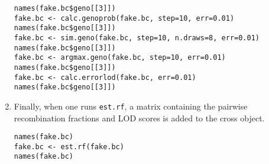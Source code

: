 \documentclass[10pt,letterpaper]{article}
\newcommand{\usercolor}{\color [named]{BlueViolet}}
\begin{document}
\begin{enumerate}
\usercolor
\verb|names(fake.bc$geno[[3]])| \\ %
\verb|fake.bc <- calc.genoprob(fake.bc, step=10, err=0.01)| \\
\verb|names(fake.bc$geno[[3]])| \\ %
\verb|fake.bc <- sim.geno(fake.bc, step=10, n.draws=8, err=0.01)| \\
\verb|names(fake.bc$geno[[3]])| \\ %
\verb|fake.bc <- argmax.geno(fake.bc, step=10, err=0.01)| \\
\verb|names(fake.bc$geno[[3]])| \\ %
\verb|fake.bc <- calc.errorlod(fake.bc, err=0.01)| \\
\verb|names(fake.bc$geno[[3]])|%
\normalcolor

\item Finally, when one runs \verb-est.rf-, a matrix containing the
pairwise recombination fractions and LOD scores is added to the cross
object.

\usercolor
\verb|names(fake.bc)| \\
\verb|fake.bc <- est.rf(fake.bc)| \\
\verb|names(fake.bc)|
\normalcolor

\end{enumerate}
\end{document}
